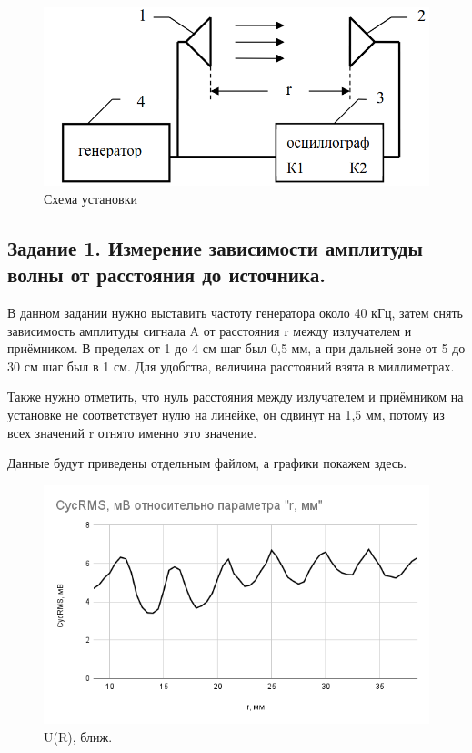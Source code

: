 \documentclass[a4paper,12pt]{article}
\begin{document}
\begin{figure}[ht!]
    \centering
    \includegraphics[scale=0.7]{scheme_1.jpg}
    \caption{Схема установки}
\end{figure}

\clearpage

\subsection{Задание 1. Измерение зависимости амплитуды волны от расстояния до источника.}

В данном задании нужно выставить частоту генератора около 40 кГц, затем снять зависимость амплитуды сигнала A от расстояния r между излучателем и приёмником. В пределах от 1 до 4 см шаг был 0,5 мм, а при дальней зоне от 5 до 30 см шаг был в 1 см. Для удобства, величина расстояний взята в миллиметрах. 

Также нужно отметить, что нуль расстояния между излучателем и приёмником на установке не соответствует нулю на линейке, он сдвинут на 1,5 мм, потому из всех значений r отнято именно это значение.

Данные будут приведены отдельным файлом, а графики покажем здесь.

\clearpage

\begin{figure}[ht!]
    \centering
    \includegraphics[scale=0.7]{ur_b.png}
    \caption{U(R), ближ.}
\end{figure}
\end{document}
